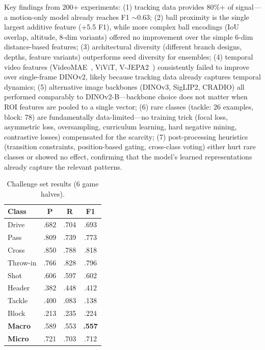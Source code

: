 Key findings from 200+ experiments: (1) tracking data provides 80\%+ of signal---a motion-only model already reaches F1 $\sim$0.63; (2) ball proximity is the single largest additive feature (+5.5 F1), while more complex ball encodings (IoU overlap, altitude, 8-dim variants) offered no improvement over the simple 6-dim distance-based features; (3) architectural diversity (different branch designs, depths, feature variants) outperforms seed diversity for ensembles; (4) temporal video features (VideoMAE~\cite{tong2022videomae}, ViViT, V-JEPA2~\cite{assran2025vjepa2}) consistently failed to improve over single-frame DINOv2, likely because tracking data already captures temporal dynamics; (5) alternative image backbones (DINOv3, SigLIP2, CRADIO) all performed comparably to DINOv2-B---backbone choice does not matter when ROI features are pooled to a single vector; (6) rare classes (tackle: 26 examples, block: 78) are fundamentally data-limited---no training trick (focal loss, asymmetric loss, oversampling, curriculum learning, hard negative mining, contrastive losses) compensated for the scarcity; (7) post-processing heuristics (transition constraints, position-based gating, cross-class voting) either hurt rare classes or showed no effect, confirming that the model's learned representations already capture the relevant patterns.

\begin{table}[h]
\centering
\small
\begin{tabular}{lccc}
\hline
\textbf{Class} & \textbf{P} & \textbf{R} & \textbf{F1} \\
\hline
Drive & .682 & .704 & .693 \\
Pass & .809 & .739 & .773 \\
Cross & .850 & .788 & .818 \\
Throw-in & .766 & .828 & .796 \\
Shot & .606 & .597 & .602 \\
Header & .382 & .448 & .412 \\
Tackle & .400 & .083 & .138 \\
Block & .213 & .235 & .224 \\
\hline
\textbf{Macro} & .589 & .553 & \textbf{.557} \\
\textbf{Micro} & .721 & .703 & .712 \\
\hline
\end{tabular}
\caption{Challenge set results (6 game halves).}
\label{tab:challenge}
\end{table}
